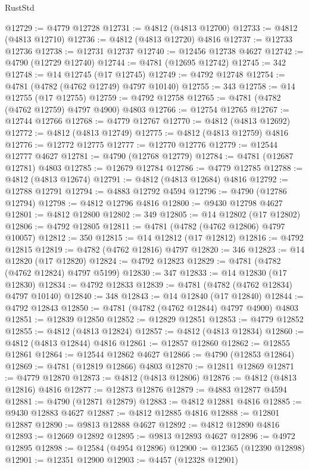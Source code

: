 \begin{lexlean}{RustStd}
\begin{coremodule}
@12729 := @4779 @12728
@12731 := @4812 (@4813 @12700)
@12733 := @4812 (@4813 @12710)
@12736 := @4812 (@4813 @12720) @4816
@12737 := @12733 @12736
@12738 := @12731 @12737
@12740 := @12456 @12738 @4627
@12742 := @4790 (@12729 @12740)
@12744 := @4781 (@12695 @12742)
@12745 := 342
@12748 := @14 @12745 (@17 @12745)
@12749 := @4792 @12748
@12754 := @4781 (@4782 (@4762 @12749) @4797 @10140)
@12755 := 343
@12758 := @14 @12755 (@17 @12755)
@12759 := @4792 @12758
@12765 := @4781 (@4782 (@4762 @12759) @4797 @4900) @4803
@12766 := @12754 @12765
@12767 := @12744 @12766
@12768 := @4779 @12767
@12770 := @4812 (@4813 @12692)
@12772 := @4812 (@4813 @12749)
@12775 := @4812 (@4813 @12759) @4816
@12776 := @12772 @12775
@12777 := @12770 @12776
@12779 := @12544 @12777 @4627
@12781 := @4790 (@12768 @12779)
@12784 := @4781 (@12687 @12781) @4803
@12785 := @12679 @12784
@12786 := @4779 @12785
@12788 := @4812 (@4813 @12674)
@12791 := @4812 (@4813 @12684) @4816
@12792 := @12788 @12791
@12794 := @4883 @12792 @4594
@12796 := @4790 (@12786 @12794)
@12798 := @4812 @12796 @4816
@12800 := @9430 @12798 @4627
@12801 := @4812 @12800
@12802 := 349
@12805 := @14 @12802 (@17 @12802)
@12806 := @4792 @12805
@12811 := @4781 (@4782 (@4762 @12806) @4797 @10057)
@12812 := 350
@12815 := @14 @12812 (@17 @12812)
@12816 := @4792 @12815
@12819 := @4782 (@4762 @12816) @4797
@12820 := 346
@12823 := @14 @12820 (@17 @12820)
@12824 := @4792 @12823
@12829 := @4781 (@4782 (@4762 @12824) @4797 @5199)
@12830 := 347
@12833 := @14 @12830 (@17 @12830)
@12834 := @4792 @12833
@12839 := @4781 (@4782 (@4762 @12834) @4797 @10140)
@12840 := 348
@12843 := @14 @12840 (@17 @12840)
@12844 := @4792 @12843
@12850 := @4781 (@4782 (@4762 @12844) @4797 @4900) @4803
@12851 := @12839 @12850
@12852 := @12829 @12851
@12853 := @4779 @12852
@12855 := @4812 (@4813 @12824)
@12857 := @4812 (@4813 @12834)
@12860 := @4812 (@4813 @12844) @4816
@12861 := @12857 @12860
@12862 := @12855 @12861
@12864 := @12544 @12862 @4627
@12866 := @4790 (@12853 @12864)
@12869 := @4781 (@12819 @12866) @4803
@12870 := @12811 @12869
@12871 := @4779 @12870
@12873 := @4812 (@4813 @12806)
@12876 := @4812 (@4813 @12816) @4816
@12877 := @12873 @12876
@12879 := @4883 @12877 @4594
@12881 := @4790 (@12871 @12879)
@12883 := @4812 @12881 @4816
@12885 := @9430 @12883 @4627
@12887 := @4812 @12885 @4816
@12888 := @12801 @12887
@12890 := @9813 @12888 @4627
@12892 := @4812 @12890 @4816
@12893 := @12669 @12892
@12895 := @9813 @12893 @4627
@12896 := @4972 @12895
@12898 := @12584 (@4954 @12896)
@12900 := @12365 (@12390 @12898)
@12901 := @12351 @12900
@12903 := @4457 (@12328 @12901)

\end{coremodule}
\end{lexlean}
